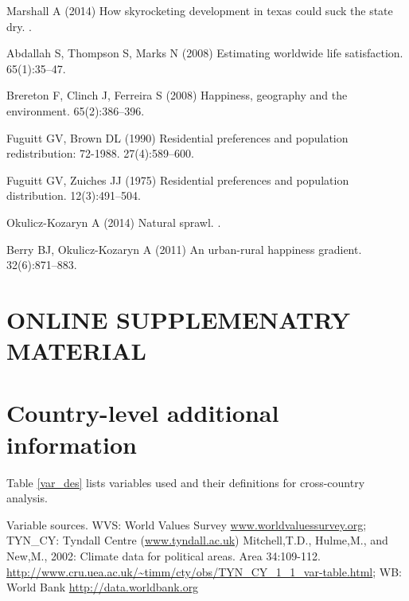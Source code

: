 \documentclass[10pt, letterpaper]{article}
\begin{document}
\begin{spacing}{1.4}
\begin{thebibliography}{10}
Marshall A (2014) How skyrocketing development in texas could suck the state
  dry.
.

Abdallah S, Thompson S, Marks N (2008) Estimating worldwide life satisfaction.
 65(1):35--47.

Brereton F, Clinch J, Ferreira S (2008) Happiness, geography and the
  environment.
 65(2):386--396.

Fuguitt GV, Brown DL (1990) Residential preferences and population
  redistribution: 72-1988.
 27(4):589--600.

Fuguitt GV, Zuiches JJ (1975) Residential preferences and population
  distribution.
 12(3):491--504.

Okulicz-Kozaryn A (2014) Natural sprawl.
.

Berry BJ, Okulicz-Kozaryn A (2011) An urban-rural happiness gradient.
 32(6):871--883.

\end{thebibliography}


\newpage
\section{\huge ONLINE SUPPLEMENATRY MATERIAL}

\tableofcontents

\section{Country-level additional information}

Table
\ref{var_des} lists variables used and their definitions for cross-country
analysis. 



{\scriptsize \noindent Variable sources. WVS: World Values Survey \url{www.worldvaluessurvey.org};
TYN\_CY: Tyndall Centre (\url{www.tyndall.ac.uk}) Mitchell,T.D., Hulme,M., and
New,M., 2002: Climate data for political areas. Area
34:109-112. \url{http://www.cru.uea.ac.uk/~timm/cty/obs/TYN_CY_1_1_var-table.html};
WB: World Bank \url{http://data.worldbank.org}}


\end{spacing}
\end{document}
